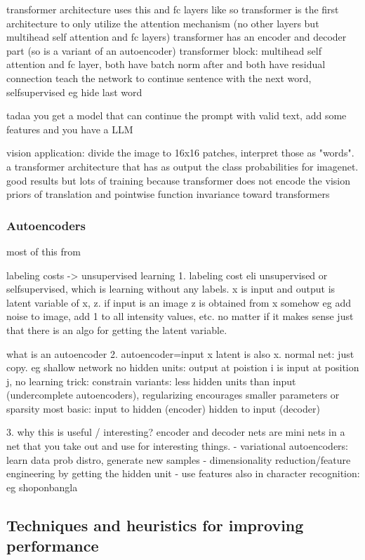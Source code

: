 \documentclass{article}
\begin{document}
transformer architecture uses this and fc layers like so
transformer is the first architecture to only utilize the attention mechanism (no other layers but multihead self attention and fc layers)
transformer has an encoder and decoder part (so is a variant of an autoencoder)
transformer block: multihead self attention and fc layer, both have batch norm after and both have residual connection
teach the network to continue sentence with the next word, selfsupervised eg hide last word

tadaa you get a model that can continue the prompt with valid text, add some features and you have a LLM

vision application: divide the image to 16x16 patches, interpret those as "words". a transformer architecture that has as output the class probabilities for imagenet. good results but lots of training because transformer does not encode the vision priors of translation and pointwise function invariance toward transformers

\subsubsection{Autoencoders}

most of this from \cite{goodfellow}

labeling costs -> unsupervised learning
1. labeling cost eli unsupervised or selfsupervised, which is learning without any labels. x is input and output is latent variable of x, z. if input is an image z is obtained from x somehow eg add noise to image, add 1 to all intensity values, etc. no matter if it makes sense just that there is an algo for getting the latent variable.

what is an autoencoder
2. autoencoder=input x latent is also x.
	normal net: just copy. eg shallow network no hidden units: output at poistion i is input at position j, no learning
	trick: constrain
		variants: less hidden units than input (undercomplete autoencoders), regularizing encourages smaller parameters or sparsity
	most basic: input to hidden (encoder) hidden to input (decoder)
		
3. why this is useful / interesting?
encoder and decoder nets are mini nets in a net that you take out and use for interesting things.
- variational autoencoders: learn data prob distro, generate new samples
- dimensionality reduction/feature engineering by getting the hidden unit
	- use features also in character recognition: eg shoponbangla

\subsection{Techniques and heuristics for improving performance}
\end{document}
